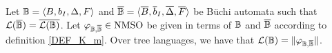 \begin{proposition} Let $\mathbb{B}= \langle B,b_I,\Delta,F\rangle$ and $\overline{\mathbb{B}} = \langle \overline{B},\overline{b}_I,\overline{\Delta},\overline{F}\rangle$ be B\"{u}chi automata such that $\mathcal{L}(\overline{\mathbb{B}}) = \overline{\mathcal{L}(\mathbb{B})}$. Let $\varphi_{\mathbb{B},\overline{\mathbb{B}}} \in \mathrm{NMSO}$ be given in terms of $\mathbb{B}$ and $\overline{\mathbb{B}}$ according to definition \ref{DEF_K_m}. Over tree languages, we have that $\mathcal{L}(  \mathbb{B}) = \|\varphi_{\mathbb{B},\overline{\mathbb{B}}}\|$. \end{proposition}
